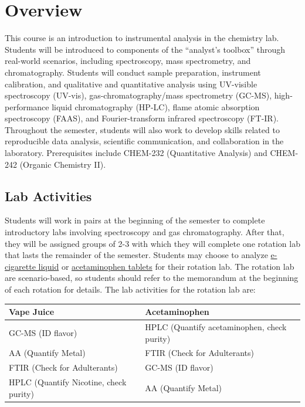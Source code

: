 \documentclass[]{tufte-book}
\begin{document}
\hypertarget{overview}{%
\chapter*{Overview}\label{overview}}

This course is an introduction to instrumental analysis in the chemistry lab. Students will be introduced to components of the ``analyst's toolbox'' through real-world scenarios, including spectroscopy, mass spectrometry, and chromatography. Students will conduct sample preparation, instrument calibration, and qualitative and quantitative analysis using UV-visible spectroscopy (UV-vis), gas-chromatography/mass spectrometry (GC-MS), high-performance liquid chromatography (HP-LC), flame atomic absorption spectroscopy (FAAS), and Fourier-transform infrared spectroscopy (FT-IR). Throughout the semester, students will also work to develop skills related to reproducible data analysis, scientific communication, and collaboration in the laboratory. Prerequisites include CHEM-232 (Quantitative Analysis) and CHEM-242 (Organic Chemistry II).

\hypertarget{lab-activities}{%
\section*{Lab Activities}\label{lab-activities}}

Students will work in pairs at the beginning of the semester to complete introductory labs involving spectroscopy and gas chromatography. After that, they will be assigned groups of 2-3 with which they will complete one rotation lab that lasts the remainder of the semester. Students may choose to analyze \href{/devel/chem370/lab-manual/rotation-a-e-cigarette-liquid.html}{e-cigarette liquid} or \href{/devel/chem370/lab-manual/rotation-b-acetaminophen.html}{acetaminophen tablets} for their rotation lab. The rotation lab are scenario-based, so students should refer to the memorandum at the beginning of each rotation for details. The lab activities for the rotation lab are:

\begin{longtable}[]{@{}ll@{}}
\toprule
Vape Juice & Acetaminophen\tabularnewline
\midrule
\endhead
GC-MS (ID flavor) & HPLC (Quantify acetaminophen, check purity)\tabularnewline
AA (Quantify Metal) & FTIR (Check for Adulterants)\tabularnewline
FTIR (Check for Adulterants) & GC-MS (ID flavor)\tabularnewline
HPLC (Quantify Nicotine, check purity) & AA (Quantify Metal)\tabularnewline
\bottomrule
\end{longtable}
\end{document}
